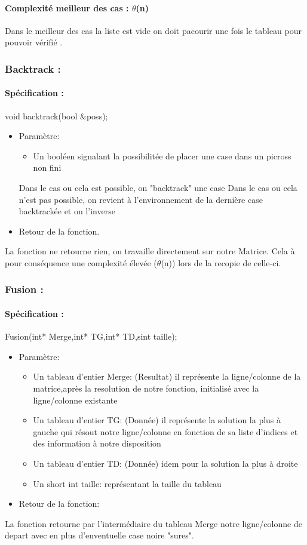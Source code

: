 \documentclass{article}
\begin{document}
\paragraph{Complexit\'e meilleur des cas : $\theta$(n)\newline}
Dans le meilleur des cas la liste est vide on doit pacourir une fois le tableau pour pouvoir v\'erifi\'e .
\subsubsection{Backtrack :}
\paragraph{Sp\'ecification :}
 void backtrack(bool \&poss);
\begin{itemize}
\item Param\`etre:
\begin{itemize}
\item Un bool\'een signalant la possibilit\'ee de placer une case dans un picross non fini
\end{itemize}
Dans le cas ou cela est possible, on "backtrack" une case
Dans le cas ou cela n'est pas possible, on revient \`a l'environnement de la derni\`ere case backtrack\'ee et on l'inverse
\item Retour de la fonction.
\end{itemize}
La fonction ne retourne rien, on travaille directement sur notre Matrice.\newline
Cela \`a pour cons\'equence une complexit\'e \'elev\'ee ($\theta$(n)) lors de la recopie de celle-ci.
\subsubsection{Fusion :}
\paragraph{Sp\'ecification :}Fusion(int* Merge,int* TG,int* TD,sint taille);
\begin{itemize}
\item Param\`etre:
\begin{itemize}
\item Un tableau d'entier Merge: (Resultat) il repr\'esente la ligne/colonne de la matrice,après la resolution de notre fonction, initialis\'e avec la ligne/colonne existante
\item Un tableau d'entier TG: (Donn\'ee) il repr\'esente la solution la plus \`a gauche qui r\'esout notre ligne/colonne en fonction de sa liste d'indices et des information \`a notre disposition
\item Un tableau d'entier TD: (Donn\'ee) idem pour la solution la plus \`a droite
\item Un short int taille: repr\'esentant la taille du tableau
\end{itemize}
\item Retour de la fonction:
\end{itemize}
La fonction retourne par l'interm\'ediaire du tableau Merge notre ligne/colonne de depart avec en plus d'enventuelle case noire "sures".
\end{document}
